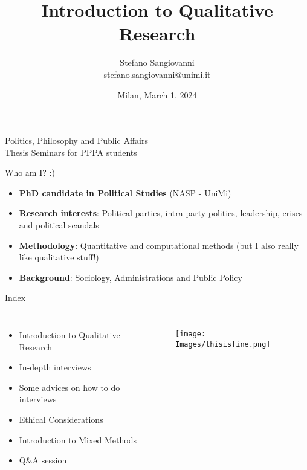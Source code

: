 \documentclass[10pt, aspectratio=169]{beamer}
\title{\textbf{Introduction to Qualitative Research}}
\author{Stefano Sangiovanni \\ \vspace{0.1cm} \small stefano.sangiovanni@unimi.it}
\date{Milan, March 1, 2024}
\newcommand{\coursename}{Politics, Philosophy and Public Affairs  \\ Thesis Seminars for PPPA students}
\begin{document}
\begin{frame}[plain]
    \centering
    \vspace*{1em} 
    \footnotesize \coursename \\
    \titlepage
    \centering
\end{frame}



\begin{frame}{Who am I? :)}
\begin{itemize}
    \item \textbf{PhD candidate in Political Studies} (NASP - UniMi)\vspace{0.3cm}
    \item \textbf{Research interests}: Political parties, intra-party politics, leadership, crises and political scandals\vspace{0.3cm}
    \item \textbf{Methodology}: Quantitative and computational methods (but I also really like qualitative stuff!)\vspace{0.3cm}
    \item \textbf{Background}: Sociology, Administrations and Public Policy \vspace{0.3cm}
\end{itemize}
\end{frame}

\begin{frame}{Index}
\begin{columns}
\begin{itemize}
\item Introduction to Qualitative Research \vspace{0.3cm}
\item In-depth interviews \vspace{0.3cm}
\item Some advices on how to do interviews\vspace{0.3cm}
\item Ethical Considerations \vspace{0.3cm}
\item Introduction to Mixed Methods \vspace{0.3cm}
\item Q\&A session
\end{itemize}
\begin{figure}
    \centering
    \texttt{[image: Images/thisisfine.png]}
    \label{fig:enter-label}
\end{figure}
\end{columns}
\end{frame}
\end{document}
